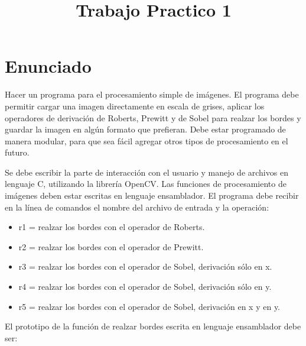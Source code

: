 \documentclass[a4paper, 10pt]{article}
\title{Trabajo Practico 1}
\begin{document}
\maketitle
\newpage

\tableofcontents

\newpage

\section{Enunciado}

Hacer un programa para el procesamiento simple de im\'agenes. El programa debe permitir cargar una imagen directamente en escala de grises, aplicar los operadores de derivaci\'on de Roberts, Prewitt y de Sobel para realzar los bordes y guardar la imagen en alg\'un formato que prefieran. Debe estar programado de manera modular, para que sea f\'acil agregar otros tipos de procesamiento en el futuro. 

Se debe escribir la parte de interacci\'on con el usuario y manejo de archivos en lenguaje C, utilizando la librer\'ia OpenCV. Las funciones de procesamiento de im\'agenes deben estar escritas en lenguaje ensamblador. El programa debe recibir en la l\'inea de comandos el nombre del archivo de entrada y la operaci\'on:

\begin{itemize}
\item r1 = realzar los bordes con el operador de Roberts.
\item r2 = realzar los bordes con el operador de Prewitt. 
\item r3 = realzar los bordes con el operador de Sobel, derivaci\'on s\'olo en x.
\item r4 = realzar los bordes con el operador de Sobel, derivaci\'on s\'olo en y.
\item r5 = realzar los bordes con el operador de Sobel, derivaci\'on en x y en y.
\end{itemize}

El prototipo de la funci\'on de realzar bordes escrita en lenguaje ensamblador debe ser: \\
\end{document}
